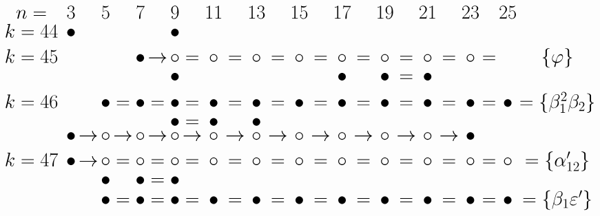 \documentclass{article}
\begin{document}
\(
\begin{tikzcd}[
nodes={font=\huge,inner sep=0pt},
row sep=0.2cm,
column sep=0.1cm
]
n= && & 3 & & 5 & & 7 & & 9 & & 11 & & 13 & & 15 & & 17 && 19 && 21 && 23 && 25\\
k=44 &&& \bullet && && && \bullet &&  \\ \\
k=45 &&&&& && \bullet &\rightarrow& \circ &=& \circ &=& \circ &=& \circ &=& \circ &=& \circ &=& \circ &=& \circ &=& & \{\varphi\}  \\
&&& && && && \bullet && && && && \bullet && \bullet &=& \bullet  \\ \\
k=46 &&& && \bullet &=& \bullet &=& \bullet &=& \bullet &=& \bullet  &=& \bullet  &=& \bullet  &=& \bullet &=& \bullet  &=& \bullet  &=& \bullet  & =\{\beta_1^2\beta_2\} \\
 &&& && && && \bullet &=& \bullet && \bullet && \\
&&& \bullet &\rightarrow& \circ &\rightarrow& \circ &\rightarrow& \circ &\rightarrow& \circ &\rightarrow& \circ &\rightarrow& \circ &\rightarrow& \circ &\rightarrow& \circ &\rightarrow& \circ &\rightarrow& \bullet \\ \\ 
k=47 &&& \bullet &\rightarrow& \circ &=& \circ &=& \circ &=& \circ &=& \circ &=& \circ &=& \circ &=& \circ &=& \circ &=& \circ &=& \circ& = \{\alpha'_{12}\} \\
&&& && \bullet && \bullet &=& \bullet && \\
&&& && \bullet &=& \bullet &=& \bullet &=& \bullet &=& \bullet  &=& \bullet  &=& \bullet  &=& \bullet &=& \bullet  &=& \bullet  &=& \bullet  & =\{\beta_1\varepsilon'\} \\
\\
\end{tikzcd}
\)
\end{document}
